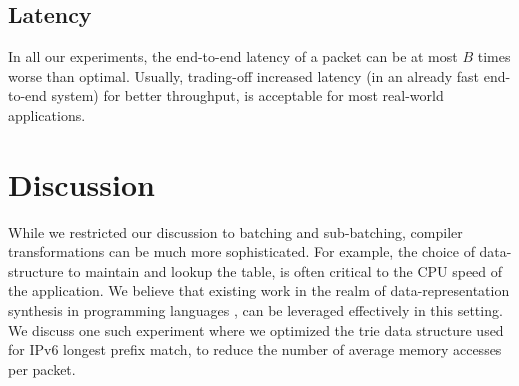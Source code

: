 
\subsection{Latency}
In all our experiments, the end-to-end latency of a packet can be at most $B$ times worse than optimal. Usually, trading-off
increased latency (in an already fast end-to-end system) for better throughput, is acceptable for most real-world
applications.

\section{Discussion}
\label{sec:discussion}
While we restricted our discussion to batching and sub-batching, compiler
transformations can be much more sophisticated. For example, the choice
of data-structure to maintain and lookup the table, is often critical
to the CPU speed of the application.
We believe that existing
work in the realm of data-representation synthesis in programming languages
\cite{data_representation_synthesis, concurrent_data_representation_synthesis},
can be leveraged effectively in this setting. We discuss one such
experiment where we optimized the trie data structure used for IPv6 longest
prefix match, to reduce the number of average memory accesses per packet.

